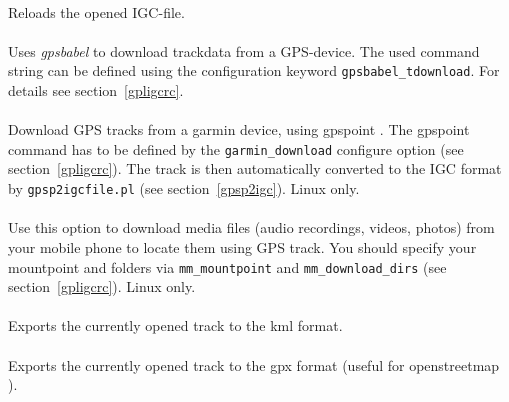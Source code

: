 \paragraph{%
}
Reloads the opened IGC-file.

\paragraph{%
}
Uses \emph{gpsbabel} \cite{gpsbabel} to download trackdata from a GPS-device.
The used command string can be defined using the configuration keyword \texttt{gpsbabel\_tdownload}.
For details see section~\ref{gpligcrc}.

\paragraph{%
}
Download GPS tracks from a garmin device, using gpspoint \cite{gpspoint}.
The gpspoint command has to be defined by the \texttt{garmin\_download} configure option (see section~\ref{gpligcrc}).
The track is then automatically converted to the IGC format by \texttt{gpsp2igcfile.pl} (see section~\ref{gpsp2igc}).
Linux only.

\paragraph{%
}
Use this option to download media files (audio recordings, videos, photos) from your mobile phone to locate them using GPS track.
You should specify your mountpoint and folders via \texttt{mm\_mountpoint} and \texttt{mm\_download\_dirs} (see section~\ref{gpligcrc}).
Linux only.

\paragraph{%
}
Exports the currently opened track to the kml format.

\paragraph{%
}
Exports the currently opened track to the gpx format (useful for openstreetmap \cite{osm}).

